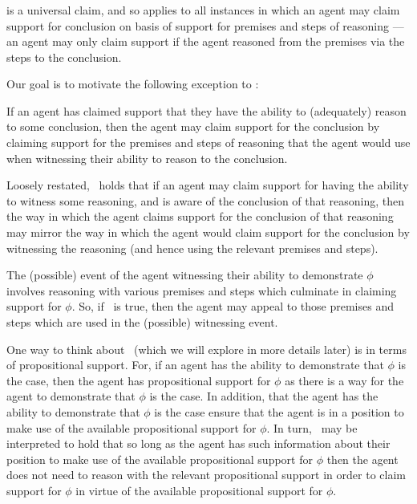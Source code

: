 \subsubsection{\EAS{}}
\label{sec:eas}

\begin{note}[Alternative]
  \ESU{} is a universal claim, and so applies to all instances in which an agent may claim support for conclusion on basis of support for premises and steps of reasoning --- an agent may only claim support if the agent reasoned from the premises via the steps to the conclusion.

  Our goal is to motivate the following exception to \ESU{}:
  \begin{proposition}[\EAS{-} --- \EAS{}]\label{rC}
    If an agent has claimed support that they have the ability to (adequately) reason to some conclusion, then the agent may claim support for the conclusion by claiming support for the premises and steps of reasoning that the agent would use when witnessing their ability to reason to the conclusion.
  \end{proposition}

  Loosely restated,~\EAS{} holds that if an agent may claim support for having the ability to witness some reasoning, and is aware of the conclusion of that reasoning, then the way in which the agent claims support for the conclusion of that reasoning may mirror the way in which the agent would claim support for the conclusion by witnessing the reasoning (and hence using the relevant premises and steps).

  The (possible) event of the agent witnessing their ability to demonstrate \(\phi\) involves reasoning with various premises and steps which culminate in claiming support for \(\phi\).
  So, if~\EAS{} is true, then the agent may appeal to those premises and steps which are used in the (possible) witnessing event.

  One way to think about~\EAS{} (which we will explore in more details later) is in terms of propositional support.
  For, if an agent has the ability to demonstrate that \(\phi\) is the case, then the agent has propositional support for \(\phi\) as there is a way for the agent to demonstrate that \(\phi\) is the case.
  In addition, that the agent has the ability to demonstrate that \(\phi\) is the case ensure that the agent is in a position to make use of the available propositional support for \(\phi\).
  In turn,~\EAS{} may be interpreted to hold that so long as the agent has such information about their position to make use of the available propositional support for \(\phi\) then the agent does not need to reason with the relevant propositional support in order to claim support for \(\phi\) in virtue of the available propositional support for \(\phi\).


\end{note}
